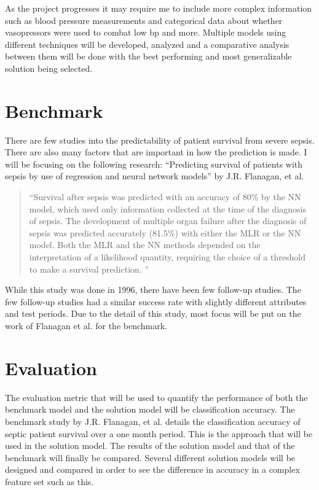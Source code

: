 \documentclass[11pt]{article}
\begin{document}
As the project progresses it may require me to include more complex information such as blood pressure measurements and categorical data about whether vasopressors were used to combat low bp and more.
Multiple models using different techniques will be developed, analyzed and a comparative analysis between them will be done with the best performing and most generalizable solution being selected.

\section{Benchmark}
There are few studies into the predictability of patient survival from severe sepsis. There are also many factors that are important in how the prediction is made. I will be focusing on the following research: ``Predicting survival of patients with sepsis by use of regression and neural network models'' by J.R. Flanagan, et al. 
\begin{quotation}
  ``Survival after sepsis was predicted with an accuracy of 80\% by the NN model, which used only information collected at the time of the diagnosis of sepsis. The development of multiple organ failure after the diagnosis of sepsis was predicted accurately (81.5\%) with either the MLR or the NN model. Both the MLR and the NN methods depended on the interpretation of a likelihood quantity, requiring the choice of a threshold to make a survival prediction. ''\cite{sepsisresearch}
\end{quotation}

While this study was done in 1996, there have been few follow-up studies. The few follow-up studies had a similar success rate with slightly different attributes and test periods. Due to the detail of this study, most focus will be put on the work of Flanagan et al. for the benchmark.

\section{Evaluation}
The evaluation metric that will be used to quantify the performance of both the benchmark model and the solution model will be classification accuracy. The benchmark study by J.R. Flanagan, et al. details the classification accuracy of septic patient survival over a one month period. This is the approach that will be used in the solution model. The results of the solution model and that of the benchmark will finally be compared. Several different solution models will be designed and compared in order to see the difference in accuracy in a complex feature set such as this.
\end{document}
